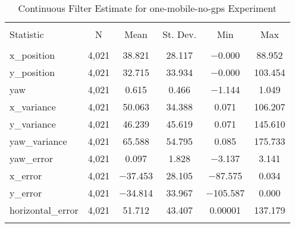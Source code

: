 
\begin{table}[h] \centering 
  \caption{Continuous Filter Estimate for one-mobile-no-gps Experiment} 
  \label{tab:one_mobile_no_gps_continuous_summary} 
\begin{tabular}{@{\extracolsep{5pt}}lccccc} 
\\[-1.8ex]\hline 
\hline \\[-1.8ex] 
Statistic & \multicolumn{1}{c}{N} & \multicolumn{1}{c}{Mean} & \multicolumn{1}{c}{St. Dev.} & \multicolumn{1}{c}{Min} & \multicolumn{1}{c}{Max} \\ 
\hline \\[-1.8ex] 
x\_position & 4,021 & 38.821 & 28.117 & $-$0.000 & 88.952 \\ 
y\_position & 4,021 & 32.715 & 33.934 & $-$0.000 & 103.454 \\ 
yaw & 4,021 & 0.615 & 0.466 & $-$1.144 & 1.049 \\ 
x\_variance & 4,021 & 50.063 & 34.388 & 0.071 & 106.207 \\ 
y\_variance & 4,021 & 46.239 & 45.619 & 0.071 & 145.610 \\ 
yaw\_variance & 4,021 & 65.588 & 54.795 & 0.085 & 175.733 \\ 
yaw\_error & 4,021 & 0.097 & 1.828 & $-$3.137 & 3.141 \\ 
x\_error & 4,021 & $-$37.453 & 28.105 & $-$87.575 & 0.034 \\ 
y\_error & 4,021 & $-$34.814 & 33.967 & $-$105.587 & 0.000 \\ 
horizontal\_error & 4,021 & 51.712 & 43.407 & 0.00001 & 137.179 \\ 
\hline \\[-1.8ex] 
\end{tabular} 
\end{table} 
